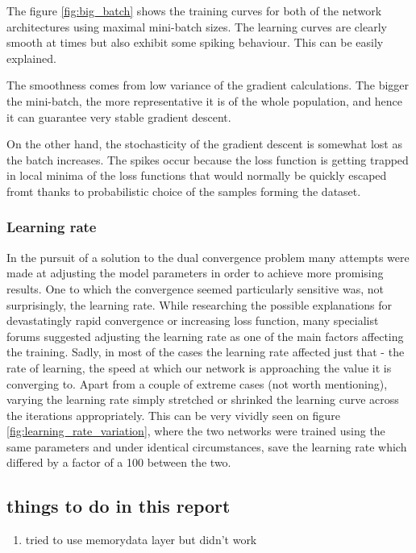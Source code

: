 \documentclass[a4paper, 12pt]{article}
\numberwithin{equation}{section}
\begin{document}
	The figure \ref{fig:big_batch} shows the training curves for both of the network architectures using maximal mini-batch sizes. The learning curves are clearly smooth at times but also exhibit some spiking behaviour. This can be easily explained.
	
	The smoothness comes from low variance of the gradient calculations. The bigger the mini-batch, the more representative it is of the whole population, and hence it can guarantee very stable gradient descent.
	
	On the other hand, the stochasticity of the gradient descent is somewhat lost as the batch increases. The spikes occur because the loss function is getting trapped in local minima of the loss functions that would normally be quickly escaped fromt thanks to probabilistic choice of the samples forming the dataset.
	
	\subsubsection{Learning rate}
	
	In the pursuit of a solution to the dual convergence problem many attempts were made at adjusting the model parameters in order to achieve more promising results. One to which the convergence seemed particularly sensitive was, not surprisingly, the learning rate. While researching the possible explanations for devastatingly rapid convergence or increasing loss function, many specialist forums suggested adjusting the learning rate as one of the main factors affecting the training. Sadly, in most of the cases the learning rate affected just that - the rate of learning, the speed at which our network is approaching the value it is converging to. Apart from a couple of extreme cases (not worth mentioning), varying the learning rate simply stretched or shrinked the learning curve across the iterations appropriately. This can be very vividly seen on figure \ref{fig:learning_rate_variation}, where the two networks were trained using the same parameters and under identical circumstances, save the learning rate which differed by a factor of a 100 between the two.
	
	
	\newpage
	\clearpage
	\subsection{things to do in this report}
	\begin{enumerate}
		\item tried to use memorydata layer but didn't work
	
			

	\end{enumerate}
	
\end{document}

